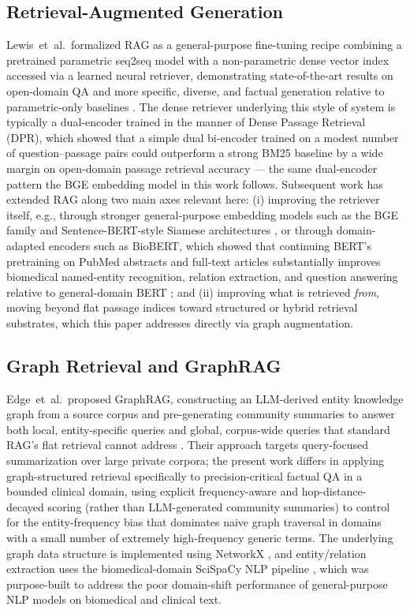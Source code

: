 \documentclass[conference]{IEEEtran}
\begin{document}
\subsection{Retrieval-Augmented Generation}
Lewis~et~al.\ formalized RAG as a general-purpose fine-tuning recipe combining a pretrained parametric seq2seq model with a non-parametric dense vector index accessed via a learned neural retriever, demonstrating state-of-the-art results on open-domain QA and more specific, diverse, and factual generation relative to parametric-only baselines \cite{lewis2020retrieval}. The dense retriever underlying this style of system is typically a dual-encoder trained in the manner of Dense Passage Retrieval (DPR), which showed that a simple dual bi-encoder trained on a modest number of question--passage pairs could outperform a strong BM25 baseline by a wide margin on open-domain passage retrieval accuracy \cite{karpukhin2020dpr} --- the same dual-encoder pattern the BGE embedding model in this work follows. Subsequent work has extended RAG along two main axes relevant here: (i) improving the retriever itself, e.g., through stronger general-purpose embedding models such as the BGE family \cite{xiao2023cpack} and Sentence-BERT-style Siamese architectures \cite{reimers2019sentencebert}, or through domain-adapted encoders such as BioBERT, which showed that continuing BERT's pretraining on PubMed abstracts and full-text articles substantially improves biomedical named-entity recognition, relation extraction, and question answering relative to general-domain BERT \cite{lee2019biobert}; and (ii) improving what is retrieved \emph{from}, moving beyond flat passage indices toward structured or hybrid retrieval substrates, which this paper addresses directly via graph augmentation.

\subsection{Graph Retrieval and GraphRAG}
Edge~et~al.\ proposed GraphRAG, constructing an LLM-derived entity knowledge graph from a source corpus and pre-generating community summaries to answer both local, entity-specific queries and global, corpus-wide queries that standard RAG's flat retrieval cannot address \cite{edge2024graphrag}. Their approach targets query-focused summarization over large private corpora; the present work differs in applying graph-structured retrieval specifically to precision-critical factual QA in a bounded clinical domain, using explicit frequency-aware and hop-distance-decayed scoring (rather than LLM-generated community summaries) to control for the entity-frequency bias that dominates naive graph traversal in domains with a small number of extremely high-frequency generic terms. The underlying graph data structure is implemented using NetworkX \cite{hagberg2008exploring}, and entity/relation extraction uses the biomedical-domain SciSpaCy NLP pipeline \cite{neumann2019scispacy}, which was purpose-built to address the poor domain-shift performance of general-purpose NLP models on biomedical and clinical text.
\end{document}
